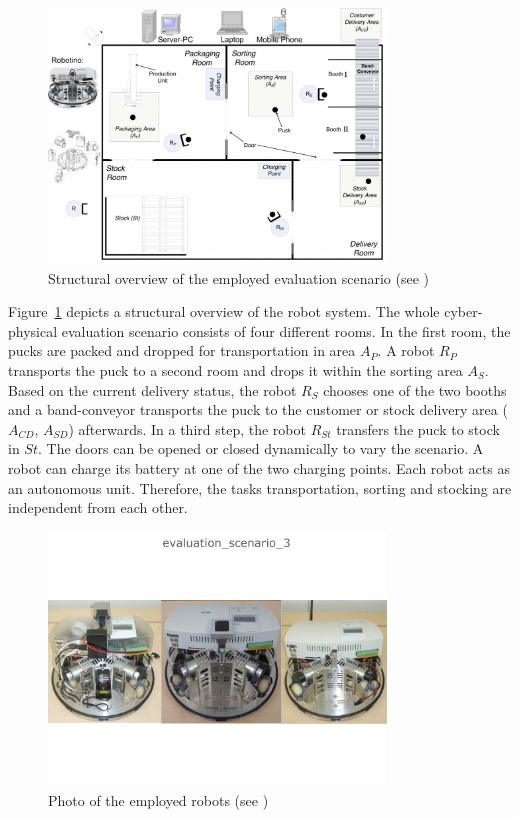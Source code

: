 \begin{figure}[!htb]
\centering
\includegraphics[width=0.8\textwidth]{figures/evaluation_scenario_1.pdf}
\caption{Structural overview of the employed evaluation scenario (see \cite{Waetzoldt:2012pa})}
\label{fig:evaluation_scenario_1}
\end{figure}

Figure~\ref{fig:evaluation_scenario_1} depicts a structural overview of the robot system. The whole cyber-physical evaluation scenario consists of four different rooms. In the first room, the pucks are packed and dropped for transportation in area $A_P$. A robot $R_P$ transports the puck to a second room and drops it within the sorting area $A_S$. Based on the current delivery status, the robot $R_S$ chooses one of the two booths and a band-conveyor transports the puck to the customer or stock delivery area ($A_{CD}$, $A_{SD}$) afterwards. In a third step, the robot $R_{St}$ transfers the puck to stock in $St$. The doors can be opened or closed dynamically to vary the scenario. A robot can charge its battery at one of the two charging points. Each robot acts as an autonomous unit. Therefore, the tasks transportation, sorting and stocking are independent from each other.

\begin{figure}[!htb]
\centering
\includegraphics[width=0.8\textwidth]{figures/evaluation_scenario_3.pdf}
\caption{Photo of the employed robots (see \cite{Waetzoldt:2012pa})}
\label{fig:evaluation_scenario_3}
\end{figure}


